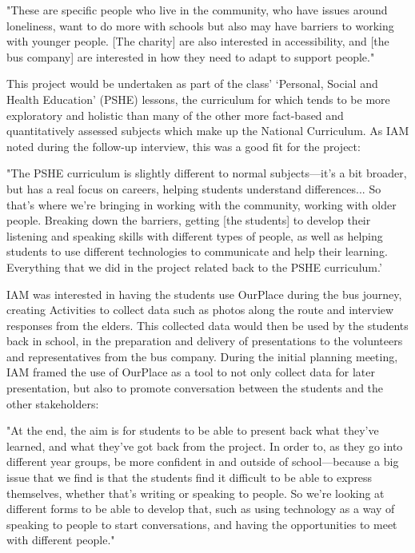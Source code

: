 \begin{displayquote}
"These are specific people who live in the community, who have issues around loneliness, want to do more with schools but also may have barriers to working with younger people. [The charity] are also interested in accessibility, and [the bus company] are interested in how they need to adapt to support people."
\end{displayquote}

This project would be undertaken as part of the class' `Personal, Social and Health Education' (PSHE) lessons, the curriculum for which tends to be more exploratory and holistic than many of the other more fact-based and quantitatively assessed subjects which make up the National Curriculum. As IAM noted during the follow-up interview, this was a good fit for the project:

\begin{displayquote}
"The PSHE curriculum is slightly different to normal subjects---it's a bit broader, but has a real focus on careers, helping students understand differences... So that's where we're bringing in working with the community, working with older people. Breaking down the barriers, getting [the students] to develop their listening and speaking skills with different types of people, as well as helping students to use different technologies to communicate and help their learning. Everything that we did in the project related back to the PSHE curriculum.'
\end{displayquote}

IAM was interested in having the students use OurPlace during the bus journey, creating Activities to collect data such as photos along the route and interview responses from the elders. This collected data would then be used by the students back in school, in the preparation and delivery of presentations to the volunteers and representatives from the bus company. During the initial planning meeting, IAM framed the use of OurPlace as a tool to not only collect data for later presentation, but also to promote conversation between the students and the other stakeholders:

\begin{displayquote}
"At the end, the aim is for students to be able to present back what they've learned, and what they've got back from the project. In order to, as they go into different year groups, be more confident in and outside of school---because a big issue that we find is that the students find it difficult to be able to express themselves, whether that's writing or speaking to people. So we're looking at different forms to be able to develop that, such as using technology as a way of speaking to people to start conversations, and having the opportunities to meet with different people."
\end{displayquote}

